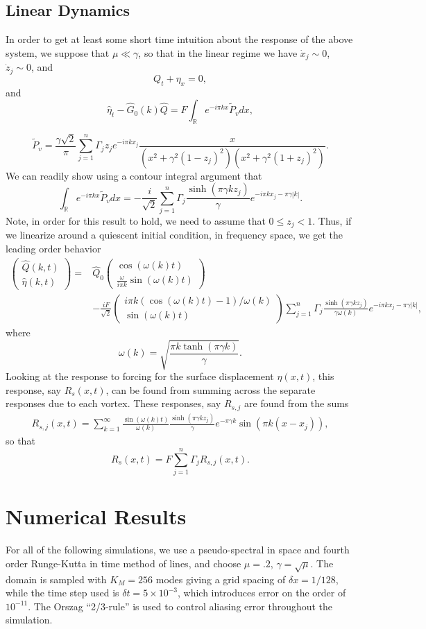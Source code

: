 \documentclass[a4paper,11pt]{article}
\newcommand{\bp}{\begin{pmatrix}}
\newcommand{\ep}{\end{pmatrix}}
\begin{document}
\subsection{Linear Dynamics}
In order to get at least some short time intuition about the response of the above system, we suppose that $\mu \ll \gamma$, so that in the linear regime we have $\dot{x}_{j}\sim 0$, $\dot{z}_{j}\sim 0$, and 
\[
Q_{t} + \eta_{x} = 0,
\]
and
\[
\hat{\eta}_{t} -\hat{G}_{0}(k)\hat{Q} = F\int_{\mathbb{R}}e^{-i \pi kx} \tilde{P}_{v}dx,
\]

\[
\tilde{P}_{v} = \frac{\gamma\sqrt{2}}{\pi}\sum_{j=1}^{n}\Gamma_{j}z_{j}e^{-i\pi kx_{j}} \frac{x}{(x^{2}+\gamma^{2}(1-z_{j})^{2})(x^{2}+\gamma^{2}(1+z_{j})^{2})} .
\]
We can readily show using a contour integral argument that 
\[
\int_{\mathbb{R}}e^{-i\pi kx} \tilde{P}_{v}dx = -\frac{i}{\sqrt{2}}\sum_{j=1}^{n}\Gamma_{j} \frac{\sinh(\pi \gamma k z_{j})}{\gamma} e^{-i\pi kx_{j}-\pi \gamma |k|}. 
\]
Note, in order for this result to hold, we need to assume that $0\leq z_{j} <1$.  Thus, if we linearize around a quiescent initial condition, in frequency space, we get the leading order behavior
\begin{align*}
\bp \hat{Q}(k,t) \\ \hat{\eta}(k,t) \ep = & \hat{Q}_{0}\bp \cos(\omega(k)t)\\\frac{ \omega}{i\pi k} \sin(\omega(k)t)\ep \\
&-\frac{iF}{\sqrt{2}}\bp i\pi k(\cos(\omega(k)t)-1)/\omega(k) \\   \sin(\omega(k)t) \ep \sum_{j=1}^{n}\Gamma_{j}\frac{\sinh(\pi \gamma k z_{j})}{\gamma \omega(k)}e^{-i\pi kx_{j}-\pi \gamma |k|},
\end{align*}
where 
\[
\omega(k) = \sqrt{\frac{ \pi k \tanh(\pi \gamma k)}{ \gamma }}.  
\]
Looking at the response to forcing for the surface displacement $\eta(x,t)$, this response, say $R_{s}(x,t)$, can be found from summing across the separate responses due to each vortex.  These responses, say $R_{s,j}$ are found from the sums
\begin{align*}
R_{s,j}(x,t) = \sum_{k=1}^{\infty} \frac{\sin(\omega(k)t)}{\omega(k)}\frac{\sinh(\pi \gamma k z_{j})}{\gamma}e^{-\pi \gamma k}\sin(\pi k (x-x_{j})),
\end{align*}
so that 
\[
R_{s}(x,t) = F\sum_{j=1}^{n}\Gamma_{j}R_{s,j}(x,t).
\]
\section{Numerical Results}
For all of the following simulations, we use a pseudo-spectral in space and fourth order Runge-Kutta in time method of lines, and choose $\mu=.2$, $\gamma = \sqrt{\mu}$. 
The domain is sampled with $K_{M} = 256$ modes giving a grid spacing of $\delta x = 1/128$, while the time step used is $\delta t = 5\times 10^{-3}$, which introduces error on the order of $10^{-11}$.  The Orszag ``2/3-rule'' is used to control aliasing error throughout the simulation.      
\end{document}
